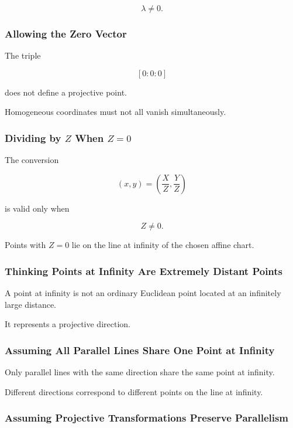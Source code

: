 \[
\lambda\neq0.
\]

\subsubsection{Allowing the Zero Vector}

The triple

\[
[0:0:0]
\]

does not define a projective point.

Homogeneous coordinates must not all vanish simultaneously.

\subsubsection{Dividing by \(Z\) When \(Z=0\)}

The conversion

\[
(x,y)=
\left(
\frac{X}{Z},
\frac{Y}{Z}
\right)
\]

is valid only when

\[
Z\neq0.
\]

Points with \(Z=0\) lie on the line at infinity of the chosen affine chart.

\subsubsection{Thinking Points at Infinity Are Extremely Distant Points}

A point at infinity is not an ordinary Euclidean point located at an
infinitely large distance.

It represents a projective direction.

\subsubsection{Assuming All Parallel Lines Share One Point at Infinity}

Only parallel lines with the same direction share the same point at infinity.

Different directions correspond to different points on the line at infinity.

\subsubsection{Assuming Projective Transformations Preserve Parallelism}

